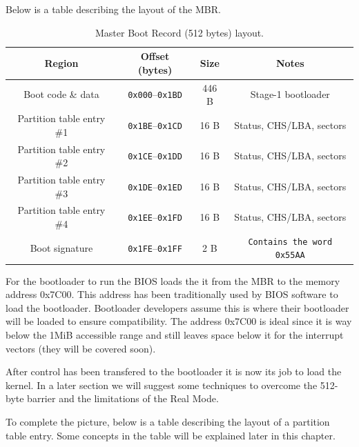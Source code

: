 Below is a table describing the layout of the MBR.

\begin{table}[h]
    \centering
    \renewcommand{\arraystretch}{1.15}
    \begin{tabular}{|c|c|c|c|}
    \hline
    \textbf{Region} & \textbf{Offset (bytes)} & \textbf{Size} & \textbf{Notes} \\
    \hline
    Boot code \& data & \texttt{0x000}–\texttt{0x1BD} & 446 B & Stage-1 bootloader \\
    \hline
    Partition table entry \#1 & \texttt{0x1BE}–\texttt{0x1CD} & 16 B & Status, CHS/LBA, sectors \\
    \hline
    Partition table entry \#2 & \texttt{0x1CE}–\texttt{0x1DD} & 16 B & Status, CHS/LBA, sectors \\
    \hline
    Partition table entry \#3 & \texttt{0x1DE}–\texttt{0x1ED} & 16 B & Status, CHS/LBA, sectors \\
    \hline
    Partition table entry \#4 & \texttt{0x1EE}–\texttt{0x1FD} & 16 B & Status, CHS/LBA, sectors \\
    \hline
    Boot signature & \texttt{0x1FE}–\texttt{0x1FF} & 2 B & \texttt{Contains the word 0x55AA} \\
    \hline
    \end{tabular}
    \caption{Master Boot Record (512 bytes) layout.}
\end{table}
    
For the bootloader to run the BIOS loads the it from the MBR to the memory address 0x7C00. This address has been
traditionally used by BIOS software to load the bootloader. Bootloader developers assume this is where their 
bootloader will be loaded to ensure compatibility. The address 0x7C00 is ideal since it is way below the 1MiB 
accessible range and still leaves space below it for the interrupt vectors (they will be covered soon).

After control has been transfered to the bootloader it is now its job to load the kernel. In a later section 
we will suggest some techniques to overcome the 512-byte barrier and the limitations of the Real Mode. 

To complete the picture, below is a table describing the layout of a partition table entry.
Some concepts in the table will be explained later in this chapter.

